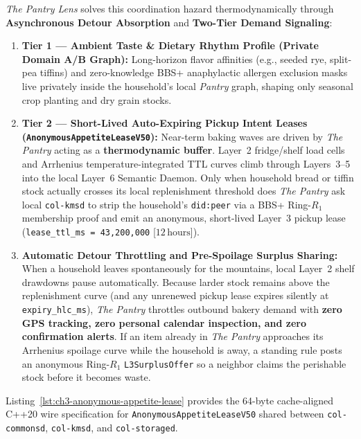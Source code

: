 \textit{The Pantry Lens} solves this coordination hazard thermodynamically through \textbf{Asynchronous Detour Absorption} and \textbf{Two-Tier Demand Signaling}:
\begin{enumerate}
    \item \textbf{Tier 1 --- Ambient Taste \& Dietary Rhythm Profile (Private Domain A/B Graph):} Long-horizon flavor affinities (e.g., seeded rye, split-pea tiffins) and zero-knowledge BBS+ anaphylactic allergen exclusion masks live privately inside the household's local \textit{Pantry} graph, shaping only seasonal crop planting and dry grain stocks.
    \item \textbf{Tier 2 --- Short-Lived Auto-Expiring Pickup Intent Leases (\texttt{AnonymousAppetiteLeaseV50}):} Near-term baking waves are driven by \textit{The Pantry} acting as a \textbf{thermodynamic buffer}. Layer~2 fridge/shelf load cells and Arrhenius temperature-integrated TTL curves climb through Layers~3--5 into the local Layer~6 Semantic Daemon. Only when household bread or tiffin stock actually crosses its local replenishment threshold does \textit{The Pantry} ask local \texttt{col-kmsd} to strip the household's \texttt{did:peer} via a BBS+ Ring-$R_1$ membership proof and emit an anonymous, short-lived Layer~3 pickup lease (\texttt{lease\_ttl\_ms = 43,200,000} [$12\,\mathrm{hours}$]).
    \item \textbf{Automatic Detour Throttling and Pre-Spoilage Surplus Sharing:} When a household leaves spontaneously for the mountains, local Layer~2 shelf drawdowns pause automatically. Because larder stock remains above the replenishment curve (and any unrenewed pickup lease expires silently at \texttt{expiry\_hlc\_ms}), \textit{The Pantry} throttles outbound bakery demand with \textbf{zero GPS tracking, zero personal calendar inspection, and zero confirmation alerts}. If an item already in \textit{The Pantry} approaches its Arrhenius spoilage curve while the household is away, a standing rule posts an anonymous Ring-$R_1$ \texttt{L3SurplusOffer} so a neighbor claims the perishable stock before it becomes waste.
\end{enumerate}

Listing~\ref{lst:ch3-anonymous-appetite-lease} provides the 64-byte cache-aligned C++20 wire specification for \texttt{AnonymousAppetiteLeaseV50} shared between \texttt{col-commonsd}, \texttt{col-kmsd}, and \texttt{col-storaged}.


